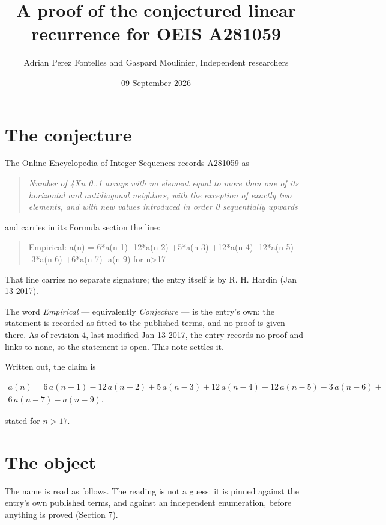 \documentclass[11pt]{article}
\title{A proof of the conjectured linear recurrence for OEIS A281059}
\author{Adrian Perez Fontelles and Gaspard Moulinier, Independent researchers}
\date{09 September 2026}
\theoremstyle{definition}
\begin{document}
\maketitle
\section{The conjecture}

The Online Encyclopedia of Integer Sequences records \href{https://oeis.org/A281059}{A281059} as

\begin{quote}\itshape Number of 4Xn 0..1 arrays with no element equal to more than one of its horizontal and antidiagonal neighbors, with the exception of exactly two elements, and with new values introduced in order 0 sequentially upwards\end{quote}

and carries in its Formula section the line:

\begin{quote}\ttfamily Empirical: a(n) = 6*a(n-1) -12*a(n-2) +5*a(n-3) +12*a(n-4) -12*a(n-5) -3*a(n-6) +6*a(n-7) -a(n-9) for n>17\end{quote}

That line carries no separate signature; the entry itself is by R. H. Hardin (Jan 13 2017).

The word {\itshape Empirical} --- equivalently {\itshape Conjecture} --- is the entry's own: the statement is recorded as fitted to the published terms, and no proof is given there. As of revision 4, last modified Jan 13 2017, the entry records no proof and links to none, so the statement is open. This note settles it.

Written out, the claim is

\begin{multline*} a(n) = 6\,a(n-1) - 12\,a(n-2) + 5\,a(n-3) + 12\,a(n-4) - 12\,a(n-5) - 3\,a(n-6) + \\ 6\,a(n-7) - a(n-9). \end{multline*}

stated for $n > 17$.

\section{The object}

The name is read as follows. The reading is not a guess: it is pinned against the entry's own published terms, and against an independent enumeration, before anything is proved (Section 7).
\end{document}
